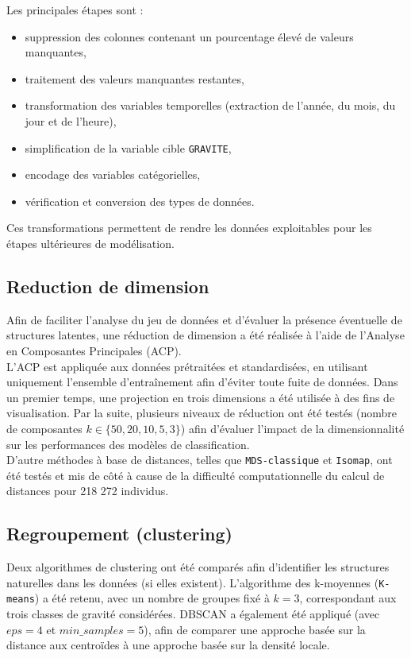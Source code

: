 \documentclass[11pt]{article}
\begin{document}
Les principales étapes sont :
\begin{itemize}
    \item suppression des colonnes contenant un pourcentage élevé de valeurs manquantes,
    \item traitement des valeurs manquantes restantes,
    \item transformation des variables temporelles (extraction de l'année, du mois, du jour et de l'heure),
    \item simplification de la variable cible \texttt{GRAVITE},
    \item encodage des variables catégorielles,
    \item vérification et conversion des types de données.
\end{itemize}

Ces transformations permettent de rendre les données exploitables pour les étapes ultérieures de modélisation.


\subsection{Reduction de dimension}
Afin de faciliter l’analyse du jeu de données et d’évaluer la présence éventuelle de structures latentes, une réduction de dimension a été réalisée à l’aide de l’Analyse en Composantes Principales (ACP). \\

L’ACP est appliquée aux données prétraitées et standardisées, en utilisant uniquement l’ensemble d’entraînement afin d’éviter toute fuite de données. Dans un premier temps, une projection en trois dimensions a été utilisée à des fins de visualisation. Par la suite, plusieurs niveaux de réduction ont été testés (nombre de composantes $k \in \{50, 20, 10, 5, 3\}$) afin d’évaluer l’impact de la dimensionnalité sur les performances des modèles de classification.\\

D'autre méthodes à base de distances, telles que \texttt{MDS-classique} et \texttt{Isomap}, ont été testés et mis de côté à cause de la difficulté computationnelle du calcul de distances pour 218 272 individus.
 
\subsection{Regroupement (clustering)}

Deux algorithmes de clustering ont été comparés afin d'identifier les
structures naturelles dans les données (si elles existent). L’algorithme des k-moyennes (\texttt{K-means}) a été retenu, avec un nombre de groupes fixé à $k=3$, correspondant aux trois classes de gravité considérées. DBSCAN a également été appliqué (avec $eps = 4$ et $min\_samples = 5$), afin de comparer une approche
basée sur la distance aux centroïdes à une approche basée sur la densité
locale.
\end{document}
